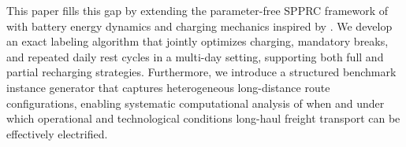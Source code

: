 \documentclass[3p,11pt,authoryear]{elsarticle}  %
\begin{document}
This paper fills this gap by extending the parameter-free SPPRC framework of \citet{goel2017exact} with battery energy dynamics and charging mechanics inspired by \citet{desaulniers2016exact}. We develop an exact labeling algorithm that jointly optimizes charging, mandatory breaks, and repeated daily rest cycles in a multi-day setting, supporting both full and partial recharging strategies. Furthermore, we introduce a structured benchmark instance generator that captures heterogeneous long-distance route configurations, enabling systematic computational analysis of when and under which operational and technological conditions long-haul freight transport can be effectively electrified.






\end{document}
